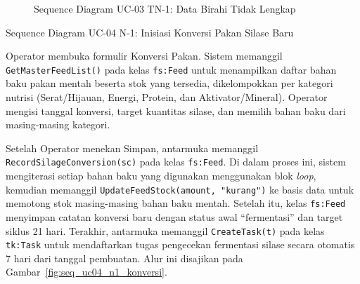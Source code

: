 \begin{figure}[htbp]
\centering
{}
\caption{Sequence Diagram UC-03 TN-1: Data Birahi Tidak Lengkap}
\label{fig:seq_uc03_tn1_validasi}
\end{figure}

\newpage


\item{Sequence Diagram UC-04 N-1: Inisiasi Konversi Pakan Silase Baru}

Operator membuka formulir Konversi Pakan. Sistem memanggil
\texttt{GetMasterFeedList()} pada kelas \texttt{fs:Feed} untuk menampilkan
daftar bahan baku pakan mentah beserta stok yang tersedia, dikelompokkan
per kategori nutrisi (Serat/Hijauan, Energi, Protein, dan
Aktivator/Mineral). Operator mengisi tanggal konversi, target kuantitas
silase, dan memilih bahan baku dari masing-masing kategori.

Setelah Operator menekan Simpan, antarmuka memanggil
\texttt{RecordSilageConversion(sc)} pada kelas \texttt{fs:Feed}. Di dalam
proses ini, sistem mengiterasi setiap bahan baku yang digunakan
menggunakan blok \textit{loop}, kemudian memanggil
\texttt{UpdateFeedStock(amount, "kurang")} ke basis data untuk memotong
stok masing-masing bahan baku mentah. Setelah itu, kelas \texttt{fs:Feed}
menyimpan catatan konversi baru dengan status awal ``fermentasi'' dan
target siklus 21 hari. Terakhir, antarmuka memanggil \texttt{CreateTask(t)}
pada kelas \texttt{tk:Task} untuk mendaftarkan tugas pengecekan fermentasi
silase secara otomatis 7 hari dari tanggal pembuatan. Alur ini disajikan
pada Gambar~\ref{fig:seq_uc04_n1_konversi}.

